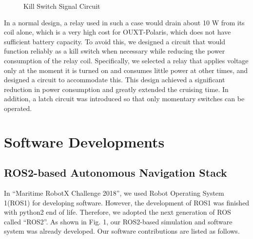 \documentclass[lettersize,journal]{IEEEtran}
\begin{document}
\begin{figure}[H]
    \begin{center}
    \end{center}
    \caption{Kill Switch Signal Circuit}
    \label{fig:kill_switch_signal_circuit}
\end{figure}

In a normal design, a relay used in such a case would drain about 10 W from its coil alone, which is a very high cost for OUXT-Polaris, which does not have sufficient battery capacity.
To avoid this, we designed a circuit that would function reliably as a kill switch when necessary while reducing the power consumption of the relay coil.
Specifically, we selected a relay that applies voltage only at the moment it is turned on and consumes little power at other times, and designed a circuit to accommodate this.
This design achieved a significant reduction in power consumption and greatly extended the cruising time.
In addition, a latch circuit was introduced so that only momentary switches can be operated.

\section{Software Developments}
\subsection{ROS2-based Autonomous Navigation Stack}
In “Maritime RobotX Challenge 2018”, we used Robot Operating System 1(ROS1) for developing software.
However, the development of ROS1 was finished with python2 end of life.
Therefore, we adopted the next generation of ROS called “ROS2”. \cite{ROS2_paper}
As shown in Fig. 1, our ROS2-based simulation and software system was already developed.
Our software contributions are listed as follows.
\end{document}
